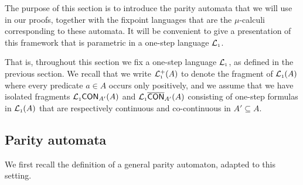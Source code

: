 
The purpose of this section is to introduce the parity automata that we will use
in our proofs, together with the fixpoint languages that are the $\mu$-calculi 
corresponding to these automata.
It will be convenient to give a presentation of this framework that is parametric
in a one-step language $\mathcal{L}_{\scriptscriptstyle 1}$.

That is, throughout this section we fix a one-step language $\mathcal{L}_{\scriptscriptstyle 1}$, as defined
in the previous section.
We recall that we write $\mathcal{L}_{\scriptscriptstyle 1}^+(A)$ to denote the fragment of $\mathcal{L}_{\scriptscriptstyle 1}(A)$ 
where every predicate $a\in A$ occurs only positively, and we assume that 
we have isolated fragments $\mathcal{L}_{\scriptscriptstyle 1}\mathsf{CON}_{A'}(A)$ and $\mathcal{L}_{\scriptscriptstyle 1}\overline{\mathsf{CON}}_{A'}(A)$
consisting of one-step formulas in $\mathcal{L}_{\scriptscriptstyle 1}(A)$ that are respectively continuous
and co-continuous in $A' \subseteq A$.

\subsection{Parity automata}

We first recall the definition of a general parity automaton, adapted to this
setting. 

